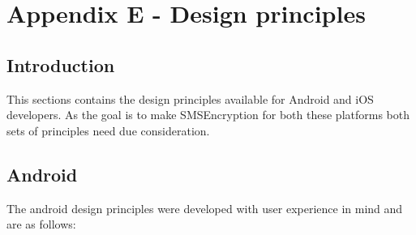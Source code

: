 \section{Appendix E - Design principles}

\subsection*{Introduction}
This sections contains the design principles available for Android and iOS developers. As the goal is to make SMSEncryption for both these platforms both sets of principles need due consideration.
\subsection*{Android}
The android design principles were developed with user experience in mind and are as follows:
